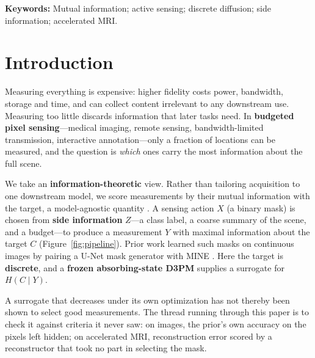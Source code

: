 \documentclass{article}
\begin{document}
\noindent\textbf{Keywords:} Mutual information; active sensing; discrete diffusion; side information; accelerated MRI.

\section{Introduction}

Measuring everything is expensive: higher fidelity costs power, bandwidth, storage and time, and can collect content irrelevant to any downstream use. Measuring too little discards information that later tasks need. In \textbf{budgeted pixel sensing}---medical imaging, remote sensing, bandwidth-limited transmission, interactive annotation---only a fraction of locations can be measured, and the question is \emph{which} ones carry the most information about the full scene.

We take an \textbf{information-theoretic} view. Rather than tailoring acquisition to one downstream model, we score measurements by their mutual information with the target, a model-agnostic quantity \citep{cover2006elements}. A sensing action $X$ (a binary mask) is chosen from \textbf{side information} $Z$---a class label, a coarse summary of the scene, and a budget---to produce a measurement $Y$ with maximal information about the target $C$ (Figure~\ref{fig:pipeline}). Prior work \citep{vuong2025cnc} learned such masks on continuous images by pairing a U-Net mask generator \citep{ronneberger2015unet} with MINE \citep{belghazi2018mine}. Here the target is \textbf{discrete}, and a \textbf{frozen absorbing-state D3PM} \citep{austin2021structured} supplies a surrogate for $H(C \mid Y)$.

A surrogate that decreases under its own optimization has not thereby been shown to select good measurements. The thread running through this paper is to check it against criteria it never saw: on images, the prior's own accuracy on the pixels left hidden; on accelerated MRI, reconstruction error scored by a reconstructor that took no part in selecting the mask.
\end{document}
